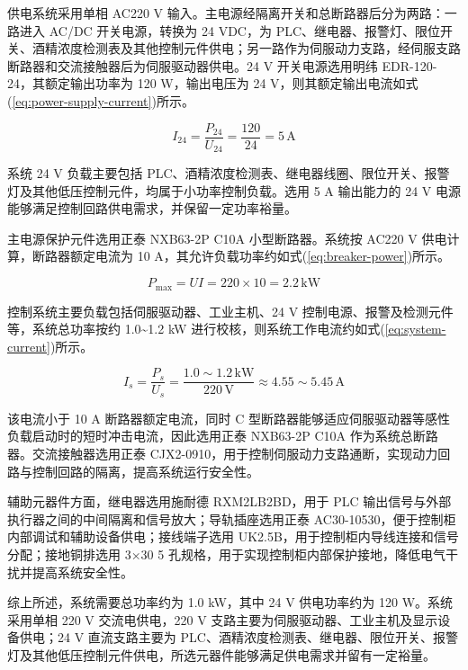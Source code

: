 供电系统采用单相 AC220 V 输入。主电源经隔离开关和总断路器后分为两路：一路进入 AC/DC 开关电源，转换为 24 VDC，为 PLC、继电器、报警灯、限位开关、酒精浓度检测表及其他控制元件供电；另一路作为伺服动力支路，经伺服支路断路器和交流接触器后为伺服驱动器供电。24 V 开关电源选用明纬 EDR-120-24，其额定输出功率为 120 W，输出电压为 24 V，则其额定输出电流如式(\ref{eq:power-supply-current})所示。

\begin{equation}\label{eq:power-supply-current}
I_{24}=\frac{P_{24}}{U_{24}}=\frac{120}{24}=5\,\mathrm{A}
\end{equation}

系统 24 V 负载主要包括 PLC、酒精浓度检测表、继电器线圈、限位开关、报警灯及其他低压控制元件，均属于小功率控制负载。选用 5 A 输出能力的 24 V 电源能够满足控制回路供电需求，并保留一定功率裕量。

主电源保护元件选用正泰 NXB63-2P C10A 小型断路器。系统按 AC220 V 供电计算，断路器额定电流为 10 A，其允许负载功率约如式(\ref{eq:breaker-power})所示。

\begin{equation}\label{eq:breaker-power}
P_{\max}=UI=220\times10=2.2\,\mathrm{kW}
\end{equation}

控制系统主要负载包括伺服驱动器、工业主机、24 V 控制电源、报警及检测元件等，系统总功率按约 1.0\textasciitilde{}1.2 kW 进行校核，则系统工作电流约如式(\ref{eq:system-current})所示。

\begin{equation}\label{eq:system-current}
I_s=\frac{P_s}{U_s}=\frac{1.0\sim1.2\,\mathrm{kW}}{220\,\mathrm{V}}
\approx4.55\sim5.45\,\mathrm{A}
\end{equation}

该电流小于 10 A 断路器额定电流，同时 C 型断路器能够适应伺服驱动器等感性负载启动时的短时冲击电流，因此选用正泰 NXB63-2P C10A 作为系统总断路器。交流接触器选用正泰 CJX2-0910，用于控制伺服动力支路通断，实现动力回路与控制回路的隔离，提高系统运行安全性。

辅助元器件方面，继电器选用施耐德 RXM2LB2BD，用于 PLC 输出信号与外部执行器之间的中间隔离和信号放大；导轨插座选用正泰 AC30-10530，便于控制柜内部调试和辅助设备供电；接线端子选用 UK2.5B，用于控制柜内导线连接和信号分配；接地铜排选用 3×30 5 孔规格，用于实现控制柜内部保护接地，降低电气干扰并提高系统安全性。

综上所述，系统需要总功率约为 1.0 kW，其中 24 V 供电功率约为 120 W。系统采用单相 220 V 交流电供电，220 V 支路主要为伺服驱动器、工业主机及显示设备供电；24 V 直流支路主要为 PLC、酒精浓度检测表、继电器、限位开关、报警灯及其他低压控制元件供电，所选元器件能够满足供电需求并留有一定裕量。

